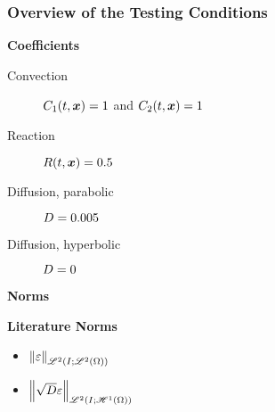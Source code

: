 \begin{frame}
    \frametitle{Overview of the Testing Conditions}

    \vspace*{\fill}
    \begin{center}
        {\color{\accentcolor} \Large \textbf{Coefficients}}
        \vspace*{0.5cm}

        \begin{minipage}{0.5\textwidth}
            \begin{description}
                \item[Convection] $C_1(t, \bm{x}) = 1$ and $C_2(t, \bm{x}) = 1$
                \item[Reaction] $R(t, \bm{x}) = 0.5$ 
                \item[Diffusion, parabolic] $D = 0.005$
                \item[Diffusion, hyperbolic] $D = 0$
            \end{description}
        \end{minipage}
    \end{center}

    \vspace*{\fill}

    \begin{center}
        {\color{\accentcolor} \Large \textbf{Norms}}
    \end{center}

    \begin{multicols}{2}

        \begin{center}
            {\color{\accentcolor} \Large \textbf{Literature Norms}}
            \vspace*{0.5cm}

            \begin{minipage}{0.25\textwidth}
                \begin{itemize}
                    \item $\left\lVert \varepsilon \right\rVert_{\mathscr{L}^{2}(I; \mathscr{L}^{2}(\Omega))}$
                    \item {\color{\accentcolor} $\left\lVert \sqrt{D} \varepsilon \right\rVert_{\mathscr{L}^{2}(I; \mathscr{H}^{1}(\Omega))}$}
                \end{itemize}
            \end{minipage}
        \end{center}


\end{multicols}
\end{frame}
